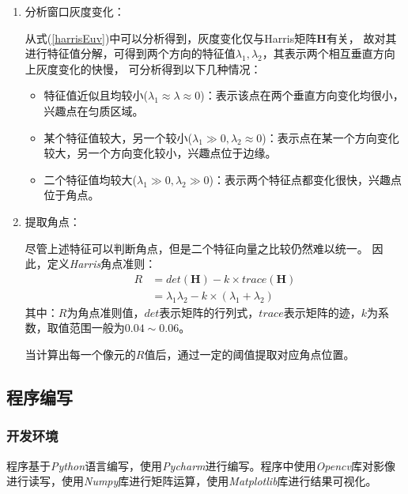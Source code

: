 \begin{enumerate}
            \item 分析窗口灰度变化：
            
            \hspace{20pt}从式(\ref{harrisEuv})中可以分析得到，灰度变化仅与Harris矩阵$\bm{H}$有关，
            故对其进行特征值分解，可得到两个方向的特征值$\lambda_1, \lambda_2$，其表示两个相互垂直方向上灰度变化的快慢，
            可分析得到以下几种情况：
            \begin{itemize}
                \item 特征值近似且均较小($\lambda_1 \approx \lambda \approx 0$)：表示该点在两个垂直方向变化均很小，兴趣点在匀质区域。
                \item 某个特征值较大，另一个较小($\lambda_1 \gg 0 , \lambda_2 \approx 0 $)：表示点在某一个方向变化较大，另一个方向变化较小，兴趣点位于边缘。
                \item 二个特征值均较大($\lambda_1 \gg 0 , \lambda_2 \gg 0$)：表示两个特征点都变化很快，兴趣点位于角点。
            \end{itemize}

            \item 提取角点：
            
            \hspace{20pt}尽管上述特征可以判断角点，但是二个特征向量之比较仍然难以统一。
            因此，定义\textit{Harris}角点准则：
                \begin{equation}
                    \begin{aligned}
                        \label{harrisR}
                        R&=det(\bm{H})-k \times trace(\bm{H})\\
                         &= \lambda_1 \lambda_2 - k \times (\lambda_1 + \lambda_2)
                    \end{aligned}
                \end{equation}
            其中：$R$为角点准则值，$det$表示矩阵的行列式，$trace$表示矩阵的迹，$k$为系数，取值范围一般为$0.04 \sim 0.06$。

            \hspace{20pt}当计算出每一个像元的$R$值后，通过一定的阈值提取对应角点位置。


        \end{enumerate}
        

\subsection{程序编写}
    \subsubsection{开发环境}
    程序基于\textit{Python}语言编写，使用\textit{Pycharm}进行编写。程序中使用\textit{Opencv}库对影像进行读写，使用\textit{Numpy}库进行矩阵运算，使用\textit{Matplotlib}库进行结果可视化。
